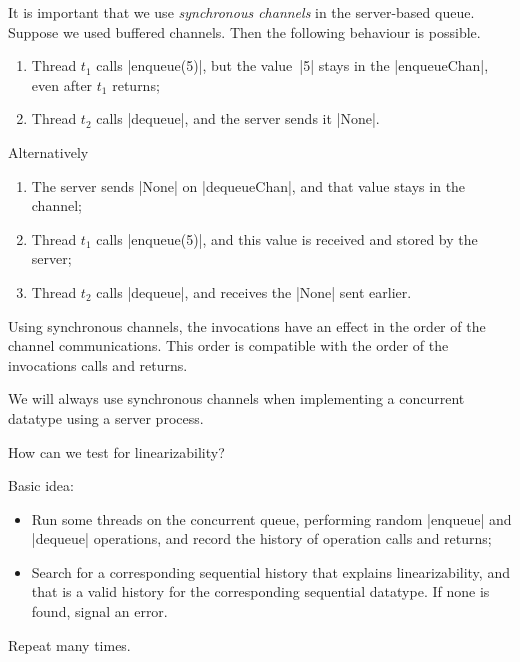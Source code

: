 
\begin{slide}

It is important that we use \emph{synchronous channels} in the server-based
queue.  Suppose we used buffered channels.  Then the following behaviour is
possible.
%
\begin{enumerate}
\item Thread $t_1$ calls |enqueue(5)|, but the value~|5| stays in the
  |enqueueChan|, even after $t_1$ returns;

\item Thread $t_2$ calls |dequeue|, and the server sends it |None|.
\end{enumerate}

Alternatively
%
\begin{enumerate}
\item The server sends |None| on |dequeueChan|, and that value stays in the
  channel; 

\item Thread $t_1$ calls |enqueue(5)|, and this value is received and stored
  by the server; 

\item Thread $t_2$ calls |dequeue|, and receives the |None| sent earlier.
\end{enumerate}
\end{slide}


\begin{slide}

Using synchronous channels, the invocations have an effect in the order of the
channel communications.  This order is compatible with the order of the
invocations calls and returns.

We will always use synchronous channels when implementing a concurrent
datatype using a server process.   
\end{slide}



\begin{slide}

How can we test for linearizability?

Basic idea: 
%
\begin{itemize}
\item Run some threads on the concurrent queue, performing random |enqueue|
and |dequeue| operations, and record the history of operation calls and
returns;

\item Search for a corresponding sequential history that explains
linearizability, and that is a valid history for the corresponding sequential
datatype.  If none is found, signal an error.
\end{itemize}
%
Repeat many times.
\end{slide}

